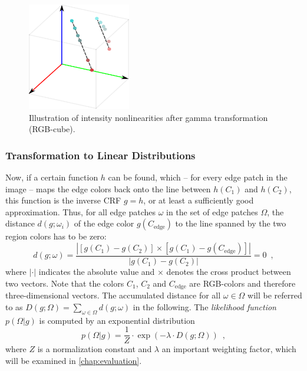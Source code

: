 \begin{figure}[bth]
	\centering
	\includegraphics[width=0.4\textwidth]{plots/rgb_cube.pdf} 
  \caption[Illustration of intensity nonlinearities after gamma transformation (RGB-cube)]{Illustration of intensity nonlinearities after gamma transformation (RGB-cube).}  
  \label{fig:gammavsnogamma}
\end{figure}


\clearpage

\subsubsection{Transformation to Linear Distributions}
\label{subsubsec:transformationtolineardistributions}
Now, if a certain function $h$ can be found, which -- for every edge patch in the image -- maps the edge colors back onto the line between $h(C_1)$ and $h(C_2)$, this function is the inverse CRF $g = h$, or at least a sufficiently good approximation. Thus, for all edge patches $\omega$ in the set of edge patches $\Omega$, the distance $d(g;\omega_i)$ of the edge color $g(C_{\text{edge}})$ to the line spanned by the two region colors has to be zero:
\begin{equation}
	d(g;\omega) = \frac{\left|\left[g(C_1)-g(C_2)\right] \times \left[g(C_1)-g(C_{\text{edge}})\right] \right|} {\left|g(C_1)-g(C_2)\right|} = 0 \enspace ,
	\label{eq:distancepointtoline}
\end{equation}
where $\left|\cdot\right|$ indicates the absolute value and $\times$ denotes the cross product between two vectors. Note that the colors $C_1$, $C_2$ and $C_{\text{edge}}$ are RGB-colors and therefore three-dimensional vectors. 
The accumulated distance for all $\omega \in \Omega$ will be referred to as $D(g;\Omega) = \sum_{\omega \in \Omega}{d(g;\omega)}$ in the following. The \emph{likelihood function} $p(\Omega|g)$ is computed by an exponential distribution
\begin{equation}
	p(\Omega|g) = \frac{1}{Z} \cdot \exp({-\lambda \cdot D(g;\Omega)}) \enspace ,
	\label{eq:likelihoodfunction}
\end{equation}
where $Z$ is a normalization constant and $\lambda$ an important weighting factor, which will be examined in \autoref{chap:evaluation}.

